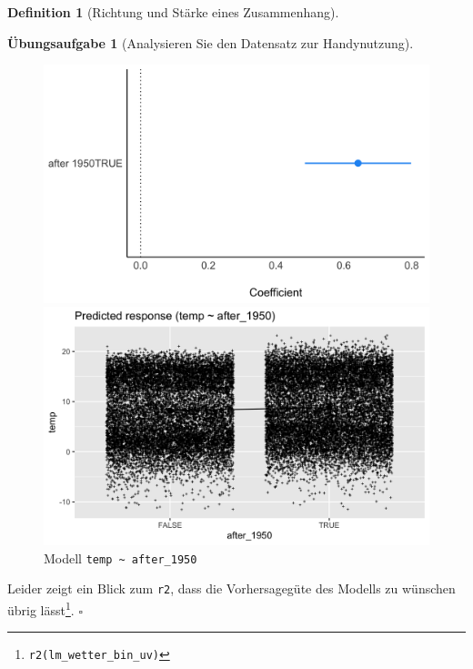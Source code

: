\documentclass[
  a4paper,
  DIV=11]{scrreprt}
\theoremstyle{definition}
\newtheorem{exercise}{Übungsaufgabe}[chapter]
\theoremstyle{definition}
\theoremstyle{definition}
\newtheorem{definition}{Definition}[chapter]
\theoremstyle{remark}
\begin{document}
\begin{definition}[Richtung und Stärke eines
Zusammenhang]
\begin{exercise}[Analysieren Sie den Datensatz zur
Handynutzung]
\begin{figure}
\begin{minipage}{0.50\linewidth}
\includegraphics{img/fig-lm-wetter-bin-uv.png}

\end{minipage}%
%
\begin{minipage}{0.50\linewidth}

\includegraphics{img/fig-temp-after1950.png}

\end{minipage}%

\caption{\label{fig-wetter2}Modell
\texttt{temp\ \textasciitilde{}\ after\_1950}}

\end{figure}%

Leider zeigt ein Blick zum \texttt{r2}, dass die Vorhersagegüte des
Modells zu wünschen übrig lässt\footnote{\texttt{r2(lm\_wetter\_bin\_uv)}}.
\(\square\)


\end{exercise}
\end{definition}
\end{document}
